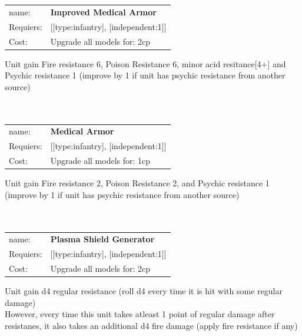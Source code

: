 \ \\
\ \\
\begin{tabular}{ll}
name: & {\bf Improved Medical Armor } \\
Requiers: & [[type:infantry], [independent:1]] \\
Cost: & Upgrade all models for: 2cp \\
\end{tabular}

Unit gain Fire resistance 6, Poison Resistance 6, minor acid resitance[4+] and Psychic resistance 1 (improve by 1 if unit has psychic resistance from another source)\\ 









\ \\
\ \\
\begin{tabular}{ll}
name: & {\bf Medical Armor } \\
Requiers: & [[type:infantry], [independent:1]] \\
Cost: & Upgrade all models for: 1cp \\
\end{tabular}

Unit gain Fire resistance 2, Poison Resistance 2, and Psychic resistance 1 (improve by 1 if unit has psychic resistance from another source)\\ 









\ \\
\ \\
\begin{tabular}{ll}
name: & {\bf Plasma Shield Generator } \\
Requiers: & [[type:infantry], [independent:1]] \\
Cost: & Upgrade all models for: 2cp \\
\end{tabular}

Unit gain d4 regular resistance (roll d4 every time it is hit with some regular damage)\\ 
However, every time this unit takes atleast 1 point of regular damage after resistanes, it also takes an additional d4 fire damage (apply fire resistance if any)\\ 




